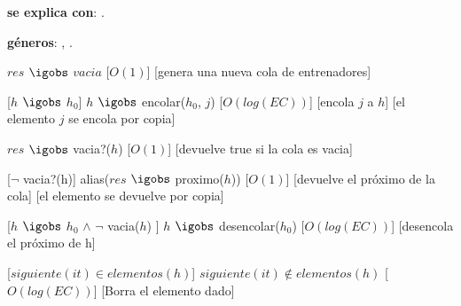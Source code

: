\begin{Interfaz}

  \textbf{se explica con}: .

  \textbf{g\'eneros}: , .



  {$res$ $\igobs$ $vacia$}%
  [$O(1)$]
  [genera una nueva cola de entrenadores]


  [$h$ $\igobs$ $h_0$]
  {$h$ $\igobs$ encolar($h_0$, $j$)}
  [$O(log(EC))$]
  [encola $j$ a $h$]
  [el elemento $j$ se encola por copia]

  {$res$ $\igobs$ vacia?($h$)}
  [$O(1)$]
  [devuelve true si la cola es vacia]


  [$\neg$ vacia?(h)]  
  {alias($res$ $\igobs$ proximo($h$))} 
  [$O(1)$]
  [devuelve el pr\'oximo de la cola]
  [el elemento se devuelve por copia]
  
  
  [$h$ $\igobs$ $h_0$ $\land$ $\neg$ vacia($h$) ]  
  {$h$ $\igobs$ desencolar($h_0$)} 
  [$O(log(EC))$]
  [desencola el pr\'oximo de h]
 


 
  [$siguiente(it) \in elementos(h)$]
  {$siguiente(it) \not\in elementos(h)$}
  [$O(log(EC))$]
  [Borra el elemento dado]
  
\end{Interfaz}

